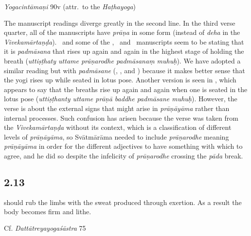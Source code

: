 \begin{ekdosis}
\begin{testimonia}[hp02_012]
\emph{Yogacintāmaṇi} 90v (attr.~to the \emph{Haṭhayoga})

\begin{versinnote}
\end{versinnote}
\end{testimonia}

\begin{philcomm}[hp02_012]
The manuscript readings diverge greatly in the second line. In the third verse quarter, all of the manuscripts have \emph{prāṇa} in some form (instead of \emph{deha} in the \emph{Vivekamārtaṇḍa}). \textalpha\ and some of the \textbeta, \textzeta\ and \texteta\ manuscripts seem to be stating that it is \emph{padmāsana} that rises up again and again in the highest stage of holding the breath (\emph{uttiṣṭhaty uttame prāṇarodhe padmāsanaṃ muhuḥ}). We have adopted a similar reading but with \emph{padmāsane} (\betaTwo, \deltaOne, and \etaTwo) because it makes better sense that the yogi rises up while seated in lotus pose. Another version is seen in \etaTwo, which appears to say that the breaths rise up again and again when one is seated in the lotus pose (\emph{uttiṣṭhanty uttame prāṇā baddhe padmāsane muhuḥ}). However, the verse is about the external signs that might arise in \emph{prāṇāyāma} rather than internal processes. Such confusion has arisen because the verse was taken from the \emph{Vivekamārtaṇḍa} without its context, which is a classification of different levels of \emph{prāṇāyāma}, so Svātmārāma needed to include \emph{prāṇarodhe} meaning \emph{prāṇāyāma} in order for the different adjectives to have something with which to agree, and he did so despite the infelicity of \emph{prāṇarodhe} crossing the \emph{pāda} break.
\end{philcomm}

\subsection*{2.13}
\begin{translation} should rub the limbs with the sweat produced through exertion. As a result the body becomes firm and lithe.%
\end{translation}

\begin{sources}[hp02_013]
Cf. \emph{Dattātreyayogaśāstra} 75


\end{sources}
\end{ekdosis}
